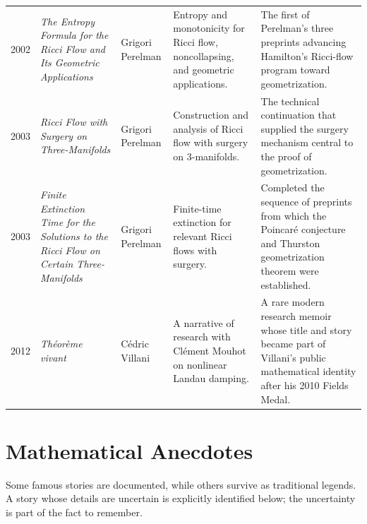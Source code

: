 {\begin{longtable}{@{}L{0.08\textwidth}L{0.21\textwidth}L{0.15\textwidth}L{0.22\textwidth}L{0.26\textwidth}@{}}
        2002
        & \textit{The Entropy Formula for the Ricci Flow and Its Geometric Applications}
        & Grigori Perelman
        & Entropy and monotonicity for Ricci flow, noncollapsing, and geometric applications.
        & The first of Perelman's three preprints advancing Hamilton's Ricci-flow program toward geometrization. \\

        2003
        & \textit{Ricci Flow with Surgery on Three-Manifolds}
        & Grigori Perelman
        & Construction and analysis of Ricci flow with surgery on $3$-manifolds.
        & The technical continuation that supplied the surgery mechanism central to the proof of geometrization. \\

        2003
        & \textit{Finite Extinction Time for the Solutions to the Ricci Flow on Certain Three-Manifolds}
        & Grigori Perelman
        & Finite-time extinction for relevant Ricci flows with surgery.
        & Completed the sequence of preprints from which the Poincar\'e conjecture and Thurston geometrization theorem were established. \\

        2012
        & \textit{Th\'eor\`eme vivant}
        & C\'edric Villani
        & A narrative of research with Cl\'ement Mouhot on nonlinear Landau damping.
        & A rare modern research memoir whose title and story became part of Villani's public mathematical identity after his 2010 Fields Medal. \\
    \end{longtable}
    }


    \section*{Mathematical Anecdotes}

    Some famous stories are documented, while others survive as traditional
    legends. A story whose details are uncertain is explicitly identified
    below; the uncertainty is part of the fact to remember.


